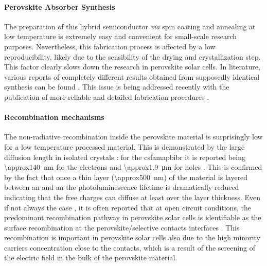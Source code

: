 	\paragraph{Perovskite Absorber Synthesis}
	The preparation of this hybrid semiconductor \textsl{via} spin coating and annealing at low temperature is extremely easy and convenient for small-scale research purposes.
	Nevertheless, this fabrication process is affected by a low reproducibility, likely due to the sensibility of the drying and crystallization step.
	This factor clearly slows down the research in perovskite solar cells.
	In literature, various reports of completely different results obtained from supposedly identical synthesis can be found \cite{Pockett2015,Gottesman2014}.
	This issue is being addressed recently with the publication of more reliable and detailed fabrication procedures \cite{Saliba2018}.

	\paragraph{Recombination mechanisms}\label{intro_prv_recombination}
	The non-radiative recombination inside the perovskite material is surprisingly low for a low temperature processed material.
	This is demonstrated by the large diffusion length in isolated crystals \cite{Wehrenfennig2014,Wehrenfennig2014a,Stranks2013,Xing2013,Shi2015a,Eperon2014}: for the \gls{csfamapbibr} it is reported being \SI{\approx140}{\nm} for the electrons and \SI{\approx1.9}{\um} for holes \cite{Liu2017}.
	This is confirmed by the fact that once a thin layer (\SI{\approx500}{\nm}) of the material is layered between an  and an  the photoluminescence lifetime is dramatically reduced \cite{Jimenez-Lopez2017,Eperon2014} indicating that the free charges can diffuse at least over the layer thickness.
	Even if not always the case \cite{Valadez-Villalobos2019,Tress2018,Peng2016}, it is often reported that at open circuit conditions, the predominant recombination pathway in perovskite solar cells is identifiable as the surface recombination at the perovskite/\-selective contacts interfaces \cite{Calado2019,Stolterfoht2018a,Stolterfoht2018,Gelmetti2019,Shao2016,Correa-Baena2017,Hou2016}.
This recombination is important in perovskite solar cells also due to the high minority carriers concentration close to the contacts, which is a result of the screening of the electric field in the bulk of the perovskite material.

